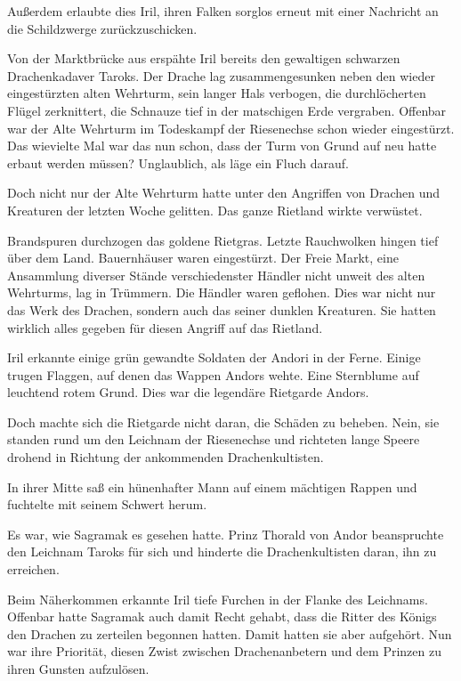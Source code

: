 Außerdem erlaubte dies Iril, ihren Falken sorglos erneut mit einer Nachricht an die Schildzwerge zurückzuschicken.

Von der Marktbrücke aus erspähte Iril bereits den gewaltigen schwarzen Drachenkadaver Taroks. Der Drache lag zusammengesunken neben den wieder eingestürzten alten Wehrturm, sein langer Hals verbogen, die durchlöcherten Flügel zerknittert, die Schnauze tief in der matschigen Erde vergraben. Offenbar war der Alte Wehrturm im Todeskampf der Riesenechse schon wieder eingestürzt. Das wievielte Mal war das nun schon, dass der Turm von Grund auf neu hatte erbaut werden müssen? Unglaublich, als läge ein Fluch darauf.

Doch nicht nur der Alte Wehrturm hatte unter den Angriffen von Drachen und Kreaturen der letzten Woche gelitten. Das ganze Rietland wirkte verwüstet.

Brandspuren durchzogen das goldene Rietgras. Letzte Rauchwolken hingen tief über dem Land. Bauernhäuser waren eingestürzt. Der Freie Markt, eine Ansammlung diverser Stände verschiedenster Händler nicht unweit des alten Wehrturms, lag in Trümmern. Die Händler waren geflohen. Dies war nicht nur das Werk des Drachen, sondern auch das seiner dunklen Kreaturen. Sie hatten wirklich alles gegeben für diesen Angriff auf das Rietland.

Iril erkannte einige grün gewandte Soldaten der Andori in der Ferne. Einige trugen Flaggen, auf denen das Wappen Andors wehte. Eine Sternblume auf leuchtend rotem Grund. Dies war die legendäre Rietgarde Andors.

Doch machte sich die Rietgarde nicht daran, die Schäden zu beheben. Nein, sie standen rund um den Leichnam der Riesenechse und richteten lange Speere drohend in Richtung der ankommenden Drachenkultisten.

In ihrer Mitte saß ein hünenhafter Mann auf einem mächtigen Rappen und fuchtelte mit seinem Schwert herum.

Es war, wie Sagramak es gesehen hatte. Prinz Thorald von Andor beanspruchte den Leichnam Taroks für sich und hinderte die Drachenkultisten daran, ihn zu erreichen.

Beim Näherkommen erkannte Iril tiefe Furchen in der Flanke des Leichnams. Offenbar hatte Sagramak auch damit Recht gehabt, dass die Ritter des Königs den Drachen zu zerteilen begonnen hatten. Damit hatten sie aber aufgehört. Nun war ihre Priorität, diesen Zwist zwischen Drachenanbetern und dem Prinzen zu ihren Gunsten aufzulösen.



